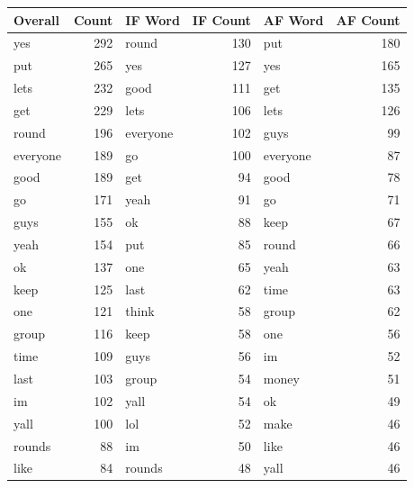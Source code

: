 \begin{tabular}{lrlrlr}
  \toprule
  Overall & Count & IF Word & IF Count & AF Word & AF Count \\ 
  \midrule
  yes & 292 & round & 130 & put & 180 \\ 
  put & 265 & yes & 127 & yes & 165 \\ 
  lets & 232 & good & 111 & get & 135 \\ 
  get & 229 & lets & 106 & lets & 126 \\ 
  round & 196 & everyone & 102 & guys & 99 \\ 
  everyone & 189 & go & 100 & everyone & 87 \\ 
  good & 189 & get & 94 & good & 78 \\ 
  go & 171 & yeah & 91 & go & 71 \\ 
  guys & 155 & ok & 88 & keep & 67 \\ 
  yeah & 154 & put & 85 & round & 66 \\ 
  ok & 137 & one & 65 & yeah & 63 \\ 
  keep & 125 & last & 62 & time & 63 \\ 
  one & 121 & think & 58 & group & 62 \\ 
  group & 116 & keep & 58 & one & 56 \\ 
  time & 109 & guys & 56 & im & 52 \\ 
  last & 103 & group & 54 & money & 51 \\ 
  im & 102 & yall & 54 & ok & 49 \\ 
  yall & 100 & lol & 52 & make & 46 \\ 
  rounds & 88 & im & 50 & like & 46 \\ 
  like & 84 & rounds & 48 & yall & 46 \\ 
  \bottomrule
\end{tabular}

